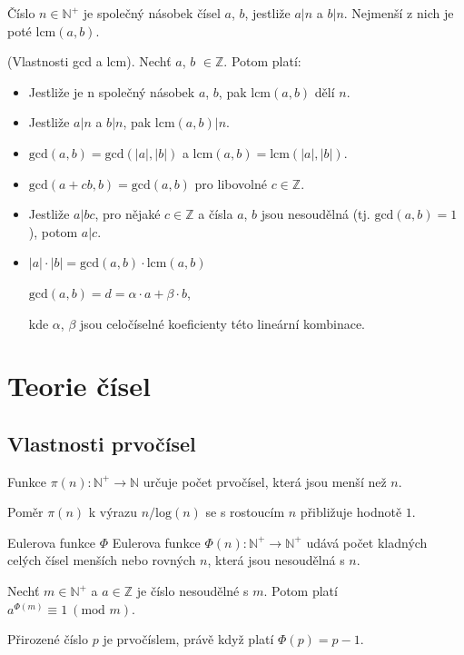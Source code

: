 \documentclass{szzclass}
\begin{document}
Číslo $n \in \mathbb{N}^+$ je společný násobek čísel $a$, $b$, jestliže $a|n$ a $b|n$. Nejmenší z nich je poté lcm$(a,b)$.

(Vlastnosti gcd a lcm). Nechť $a$, $b$ $\in \mathbb{Z}$. Potom platí:
\begin{itemize}
    \item Jestliže je n společný násobek $a$, $b$, pak $\text{lcm}(a, b)$ dělí $n$.
    \item Jestliže $a|n$ a $b|n$, pak $\text{lcm}(a, b)|n$.
    \item $\text{gcd}(a, b) = \text{gcd}(|a|, |b|)$ a $\text{lcm}(a, b) = \text{lcm}(|a|, |b|)$.
    \item $\text{gcd}(a + cb, b) = \text{gcd}(a, b)$ pro libovolné $c \in \mathbb{Z}$.
    \item Jestliže $a|bc$, pro nějaké $c \in \mathbb{Z}$ a čísla $a$, $b$ jsou nesoudělná (tj. $\text{gcd}(a, b) = 1$), potom $a|c$.
    \item $|a|\cdot|b| = \text{gcd}(a,b) \cdot \text{lcm}(a,b)$
\begin{center}
$\text{gcd}(a, b) = d = \alpha \cdot a + \beta \cdot b$,
\end{center}
kde $\alpha$, $\beta$ jsou celočíselné koeficienty této lineární kombinace.
\end{itemize}

\newpage

\section{Teorie čísel}

\subsection{Vlastnosti prvočísel}
Funkce $\pi(n) : \mathbb{N}^+ \rightarrow \mathbb{N}$ určuje počet prvočísel, která jsou menší než $n$.

Poměr $\pi(n)$ k výrazu $n/\text{log}(n)$ se s rostoucím $n$ přibližuje hodnotě $1$.

Eulerova funkce $\Phi$ Eulerova funkce $\Phi(n) : \mathbb{N}^+ \rightarrow \mathbb{N}^+$ udává počet
kladných celých čísel menších nebo rovných $n$, která jsou nesoudělná s $n$.

Nechť $m \in \mathbb{N}^+$ a $a \in \mathbb{Z}$ je číslo nesoudělné s $m$. Potom platí $a^{\Phi(m)} \equiv 1~(\text{mod }m)$.

Přirozené číslo $p$ je prvočíslem, právě když platí $\Phi(p) = p - 1$.
\end{document}
